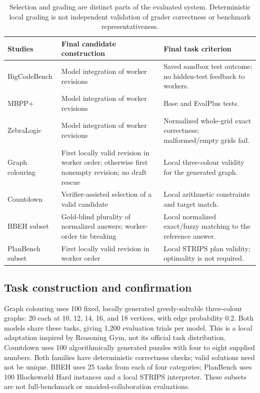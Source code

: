 \begin{table}[htbp]
\centering
\small
\begin{tabularx}{\linewidth}{@{}>{\raggedright\arraybackslash}p{}YY@{}}
\toprule
Studies & Final candidate construction & Final task criterion\\
\midrule
BigCodeBench & Model integration of worker revisions & Saved sandbox test
outcome; no hidden-test feedback to workers.\\
\addlinespace[3pt]
MBPP+ & Model integration of worker revisions & Base and EvalPlus tests.\\
\addlinespace[3pt]
ZebraLogic & Model integration of worker revisions & Normalized whole-grid
exact correctness; malformed/empty grids fail.\\
\addlinespace[3pt]
Graph colouring & First locally valid revision in worker order; otherwise
first nonempty revision; no draft rescue & Local three-colour validity for
the generated graph.\\
\addlinespace[3pt]
Countdown & Verifier-assisted selection of a valid candidate & Local arithmetic
constraints and target match.\\
\addlinespace[3pt]
BBEH subset & Gold-blind plurality of normalized answers; worker-order tie
breaking & Local normalized exact/fuzzy matching to the reference answer.\\
\addlinespace[3pt]
PlanBench subset & First locally valid revision in worker order & Local STRIPS
plan validity; optimality is not required.\\
\bottomrule
\end{tabularx}
\caption{Selection and grading are distinct parts of the evaluated system.
Deterministic local grading is not independent validation of grader correctness
or benchmark representativeness.}
\label{tab:app-graders}
\end{table}

\subsection{Task construction and confirmation}
Graph colouring uses 100 fixed, locally generated greedy-solvable
three-colour graphs: 20 each at 10, 12, 14, 16, and 18 vertices, with edge
probability 0.2. Both models share these tasks, giving 1,200 evaluation
trials per model. This is a local adaptation inspired by Reasoning Gym,
not its official task distribution. Countdown uses 100 algorithmically
generated puzzles with four to eight supplied numbers. Both families have
deterministic correctness checks; valid solutions need not be unique.
BBEH uses 25 tasks from each of four categories; PlanBench uses 100
Blocksworld Hard instances and a local STRIPS interpreter. These subsets
are not full-benchmark or unaided-collaboration evaluations.


